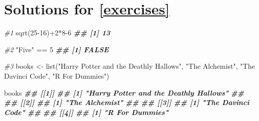 \documentclass[
]{book}
\newenvironment{Shaded}{\begin{snugshade}}{\end{snugshade}}
\newcommand{\CommentTok}[1]{\textcolor[rgb]{0.56,0.35,0.01}{\textit{#1}}}
\newcommand{\DecValTok}[1]{\textcolor[rgb]{0.00,0.00,0.81}{#1}}
\newcommand{\DocumentationTok}[1]{\textcolor[rgb]{0.56,0.35,0.01}{\textbf{\textit{#1}}}}
\newcommand{\FunctionTok}[1]{\textcolor[rgb]{0.00,0.00,0.00}{#1}}
\newcommand{\NormalTok}[1]{#1}
\newcommand{\OtherTok}[1]{\textcolor[rgb]{0.56,0.35,0.01}{#1}}
\newcommand{\SpecialCharTok}[1]{\textcolor[rgb]{0.00,0.00,0.00}{#1}}
\newcommand{\StringTok}[1]{\textcolor[rgb]{0.31,0.60,0.02}{#1}}
\begin{document}
\hypertarget{solutions-for-refexercises}{%
\section{Solutions for \ref{exercises}}\label{solutions-for-refexercises}}

\begin{Shaded}
\begin{Highlighting}[]
\CommentTok{\#1}
\FunctionTok{sqrt}\NormalTok{(}\DecValTok{25{-}16}\NormalTok{)}\SpecialCharTok{+}\DecValTok{2}\SpecialCharTok{*}\DecValTok{8{-}6}
\DocumentationTok{\#\# [1] 13}

\CommentTok{\#2}
\StringTok{"Five"} \SpecialCharTok{==} \DecValTok{5}
\DocumentationTok{\#\# [1] FALSE}

\CommentTok{\#3 }
\NormalTok{books }\OtherTok{\textless{}{-}} \FunctionTok{list}\NormalTok{(}\StringTok{"Harry Potter and the Deathly Hallows"}\NormalTok{,}
              \StringTok{"The Alchemist"}\NormalTok{,}
              \StringTok{"The Davinci Code"}\NormalTok{,}
              \StringTok{"R For Dummies"}\NormalTok{)}

\NormalTok{books}
\DocumentationTok{\#\# [[1]]}
\DocumentationTok{\#\# [1] "Harry Potter and the Deathly Hallows"}
\DocumentationTok{\#\# }
\DocumentationTok{\#\# [[2]]}
\DocumentationTok{\#\# [1] "The Alchemist"}
\DocumentationTok{\#\# }
\DocumentationTok{\#\# [[3]]}
\DocumentationTok{\#\# [1] "The Davinci Code"}
\DocumentationTok{\#\# }
\DocumentationTok{\#\# [[4]]}
\DocumentationTok{\#\# [1] "R For Dummies"}
\end{Highlighting}
\end{Shaded}


  
\end{document}
